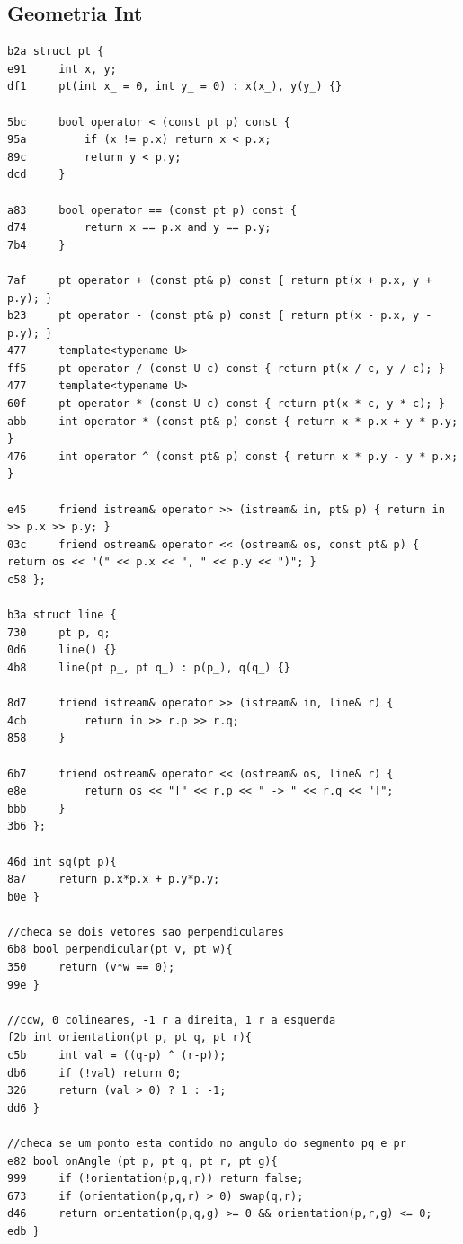 \documentclass[11pt, a4paper, twoside]{article}
\begin{document}
\subsection{Geometria Int}
\begin{lstlisting}
b2a struct pt {
e91     int x, y;
df1     pt(int x_ = 0, int y_ = 0) : x(x_), y(y_) {}
    
5bc     bool operator < (const pt p) const {
95a 		if (x != p.x) return x < p.x;
89c 		return y < p.y;
dcd 	}
    
a83 	bool operator == (const pt p) const {
d74 		return x == p.x and y == p.y;
7b4 	}
    
7af     pt operator + (const pt& p) const { return pt(x + p.x, y + p.y); }
b23     pt operator - (const pt& p) const { return pt(x - p.x, y - p.y); }
477     template<typename U> 
ff5     pt operator / (const U c) const { return pt(x / c, y / c); }
477     template<typename U> 
60f     pt operator * (const U c) const { return pt(x * c, y * c); }
abb     int operator * (const pt& p) const { return x * p.x + y * p.y; }
476     int operator ^ (const pt& p) const { return x * p.y - y * p.x; }
    
e45     friend istream& operator >> (istream& in, pt& p) { return in >> p.x >> p.y; }
03c     friend ostream& operator << (ostream& os, const pt& p) { return os << "(" << p.x << ", " << p.y << ")"; }
c58 };

b3a struct line {
730 	pt p, q;
0d6 	line() {}
4b8 	line(pt p_, pt q_) : p(p_), q(q_) {}
    
8d7     friend istream& operator >> (istream& in, line& r) {
4cb 		return in >> r.p >> r.q;
858 	}
    
6b7     friend ostream& operator << (ostream& os, line& r) {
e8e 		return os << "[" << r.p << " -> " << r.q << "]";
bbb 	}
3b6 };

46d int sq(pt p){
8a7     return p.x*p.x + p.y*p.y;
b0e }

//checa se dois vetores sao perpendiculares
6b8 bool perpendicular(pt v, pt w){
350     return (v*w == 0);
99e }

//ccw, 0 colineares, -1 r a direita, 1 r a esquerda
f2b int orientation(pt p, pt q, pt r){
c5b     int val = ((q-p) ^ (r-p));
db6     if (!val) return 0;
326     return (val > 0) ? 1 : -1;
dd6 }

//checa se um ponto esta contido no angulo do segmento pq e pr
e82 bool onAngle (pt p, pt q, pt r, pt g){
999     if (!orientation(p,q,r)) return false;
673     if (orientation(p,q,r) > 0) swap(q,r);
d46     return orientation(p,q,g) >= 0 && orientation(p,r,g) <= 0;
edb }


\end{lstlisting}
\end{document}
